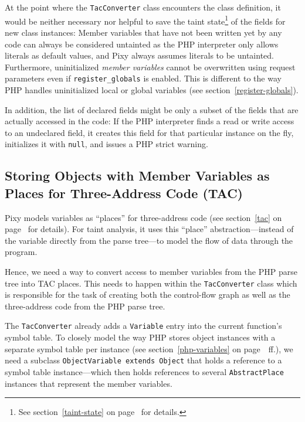 At the point where the \texttt{TacConverter} class encounters the class definition, it would be neither necessary nor helpful to save the taint state\footnote{See section~\ref{taint-state} on page~\pageref{taint-state} for details.} of the fields for new class instances: Member variables that have not been written yet by any code can always be considered untainted as the PHP interpreter only allows literals as default values, and Pixy always assumes literals to be untainted. Furthermore, uninitialized \emph{member variables} cannot be overwritten using request parameters even if \texttt{register\_globals} is enabled. This is different to the way PHP handles uninitialized local or global variables (see section~\ref{register-globals}).

In addition, the list of declared fields might be only a subset of the fields that are actually accessed in the code: If the PHP interpreter finds a read or write access to an undeclared field, it creates this field for that particular instance on the fly, initializes it with \texttt{null}, and issues a PHP strict warning.



\subsection{Storing Objects with Member Variables as Places for Three-Address Code (TAC)}

Pixy models variables as ``places'' for three-address code (see section~\ref{tac} on page~\pageref{tac} for details). For taint analysis, it uses this ``place'' abstraction---instead of the variable directly from the parse tree---to model the flow of data through the program.

Hence, we need a way to convert access to member variables from the PHP parse tree into TAC places. This needs to happen within the \texttt{TacConverter} class which is responsible for the task of creating both the control-flow graph as well as the three-address code from the PHP parse tree.

The \texttt{TacConverter} already adds a \texttt{Variable} entry into the current function's symbol table. To closely model the way PHP stores object instances with a separate symbol table per instance (see section~\ref{php-variables} on page~\pageref{php-variables}~ff.), we need a subclass \texttt{ObjectVariable extends Object} that holds a reference to a symbol table instance---which then holds references to several \texttt{AbstractPlace} instances that represent the member variables.


